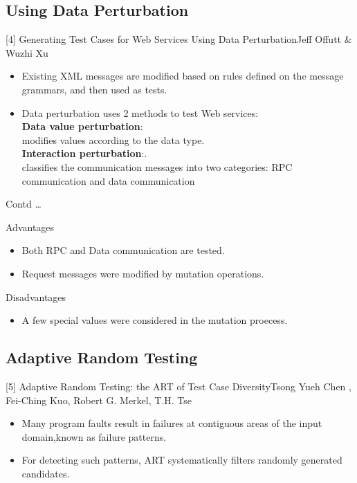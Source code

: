 \documentclass[10pt]{beamer}
\begin{document}
\subsection{Using Data Perturbation}
\begin{frame}{[4] Generating Test Cases for Web Services Using Data Perturbation}{Jeff Offutt \& Wuzhi Xu}
	\begin{itemize}
		\item Existing XML messages are modified based on rules defined on the message grammars, and then used as tests.
		\item Data perturbation uses 2 methods to test Web services:\\ \textbf{Data value perturbation}:\\ modifies values according to the data type.\\\textbf{Interaction perturbation}:.\\classifies the communication messages into two categories: RPC communication and data communication

	\end{itemize}
\end{frame}

\begin{frame}{Contd \dots}
\begin{block}{Advantages}
\begin{itemize}
\item Both RPC and Data communication are tested.
\item Request messages were modified by mutation operations. 
\end{itemize}
\end{block}
\begin{block}{Disadvantages}
\begin{itemize}
\item A few special values were considered in the mutation proecess.
\end{itemize}

\end{block}
\end{frame}
\subsection{Adaptive Random Testing}

\begin{frame}{[5] Adaptive Random Testing: the ART of Test Case Diversity}{Tsong Yueh Chen , Fei-Ching Kuo, Robert G. Merkel, T.H. Tse}


\begin{block}{}

\begin{itemize}
	\LARGE
\item Many program faults result in failures at contiguous areas of the input domain,known as failure patterns.\\
\item For detecting such patterns, ART systematically filters randomly generated candidates.
\end{itemize}
\end{block}
\end{frame}
\end{document}
